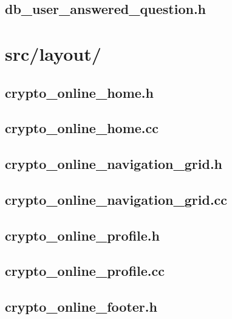 \subsection{db\_user\_answered\_question.h}

\newpage

\section{src/layout/}

\subsection{crypto\_online\_home.h}

\newpage

\subsection{crypto\_online\_home.cc}

\newpage

\subsection{crypto\_online\_navigation\_grid.h}

\newpage

\subsection{crypto\_online\_navigation\_grid.cc}

\newpage

\subsection{crypto\_online\_profile.h}

\newpage

\subsection{crypto\_online\_profile.cc}

\newpage

\subsection{crypto\_online\_footer.h}

\newpage

